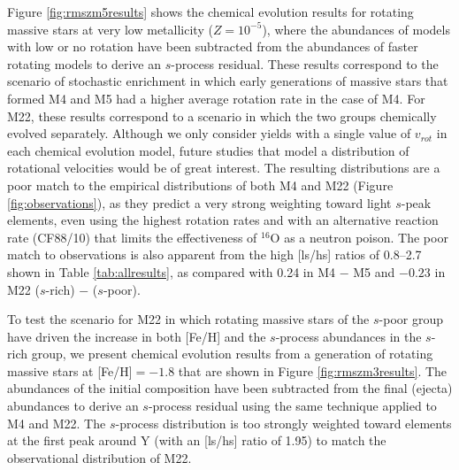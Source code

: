 Figure \ref{fig:rmszm5results} shows the chemical evolution results for rotating massive stars at very low metallicity ($Z=10^{-5}$), where the abundances of models with low or no rotation have been subtracted from the abundances of faster rotating models to derive an $s$-process residual. These results correspond to the scenario of stochastic enrichment in which early generations of massive stars that formed M4 and M5 had a higher average rotation rate in the case of M4. For M22, these results correspond to a scenario in which the two groups chemically evolved separately. Although we only consider yields with a single value of $v_{rot}$ in each chemical evolution model, future studies that model a distribution of rotational velocities would be of great interest. The resulting distributions are a poor match to the empirical distributions of both M4 and M22 (Figure \ref{fig:observations}), as they predict a very strong weighting toward light $s$-peak elements, even using the highest rotation rates and with an alternative reaction rate (CF88/10) that limits the effectiveness of $^{16}$O as a neutron poison. The poor match to observations is also apparent from the high [ls/hs] ratios of 0.8--2.7 shown in Table \ref{tab:allresults}, as compared with 0.24 in M4 $-$ M5 and $-0.23$ in M22 ($s$-rich) $-$ ($s$-poor).

To test the scenario for M22 in which rotating massive stars of the $s$-poor group have driven the increase in both [Fe/H] and the $s$-process abundances in the $s$-rich group, we present chemical evolution results from a generation of rotating massive stars at [Fe/H]$=-1.8$ that are shown in Figure \ref{fig:rmszm3results}. The abundances of the initial composition have been subtracted from the final (ejecta) abundances to derive an $s$-process residual using the same technique applied to M4 and M22. The $s$-process distribution is too strongly weighted toward elements at the first peak around Y (with an [ls/hs] ratio of 1.95) to match the observational distribution of M22.

